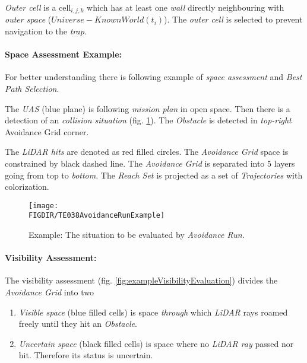 \begin{note}
    \emph{Outer cell} is a cell$_{i,j,k}$ which has at least one \emph{wall} directly neighbouring with \emph{outer space} ($Universe - Known World (t_i)$). The \emph{outer cell} is selected to prevent navigation to the \emph{trap}.
\end{note}

\paragraph{Space Assessment Example:} For better understanding there is following example of \emph{space assessment} and \emph{Best Path Selection}. 


The \emph{UAS} (blue plane) is following \emph{mission plan} in open space. Then there is a detection of an \emph{collision situation} (fig. \ref{fig:exampleSituationAvoidanceRun}). The \emph{Obstacle} is detected in \emph{top-right} Avoidance Grid corner. 

The \emph{LiDAR hits} are denoted as red filled circles. The \emph{Avoidance Grid} space is constrained by black dashed line. The \emph{Avoidance Grid} is separated into 5 layers going from top to \emph{bottom}. The \emph{Reach Set} is projected as a set of \emph{Trajectories} with colorization. 

\begin{figure}[H]
\centering
    \texttt{[image: \\FIGDIR/TE038AvoidanceRunExample]}        
    \caption{Example: The situation to be evaluated by \emph{Avoidance Run}.}
    \label{fig:exampleSituationAvoidanceRun}
\end{figure}

\paragraph{Visibility Assessment:} The visibility assessment (fig. \ref{fig:exampleVisibilityEvaluation}) divides the \emph{Avoidance Grid} into two
\begin{enumerate}
    \item \emph{Visible space} (blue filled cells) is space \emph{through} which \emph{LiDAR} rays roamed freely until they hit an \emph{Obstacle}.
    
    \item \emph{Uncertain space} (black filled cells) is space where no \emph{LiDAR ray} passed nor hit. Therefore its status is uncertain.
\end{enumerate}
 
